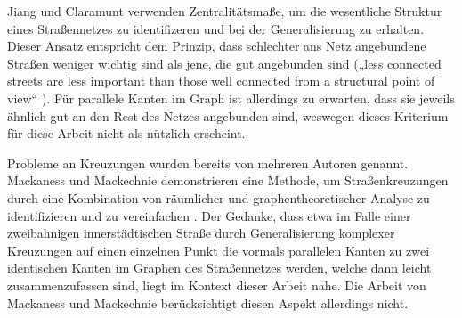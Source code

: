 \documentclass[../main/thesis.tex]{subfiles}
\begin{document}

Jiang und Claramunt verwenden Zentralitätsmaße, um die wesentliche Struktur eines Straßennetzes zu identifizeren und bei der Generalisierung zu erhalten. Dieser Ansatz entspricht dem Prinzip, dass schlechter ans Netz angebundene Straßen weniger wichtig sind als jene, die gut angebunden sind („less connected streets are less important than those well connected from a structural point of view“ ).  Für parallele Kanten im Graph ist allerdings zu erwarten, dass sie jeweils ähnlich gut an den Rest des Netzes angebunden sind, weswegen dieses Kriterium für diese Arbeit nicht als nützlich erscheint.


Probleme an Kreuzungen wurden bereits von mehreren Autoren genannt. Mackaness und Mackechnie demonstrieren eine Methode, um Straßenkreuzungen durch eine Kombination von räumlicher und graphentheoretischer Analyse zu identifizieren und zu vereinfachen . Der Gedanke, dass etwa im Falle einer zweibahnigen innerstädtischen Straße durch Generalisierung komplexer Kreuzungen auf einen einzelnen Punkt die vormals parallelen Kanten zu zwei identischen Kanten im Graphen des Straßennetzes werden, welche dann leicht zusammenzufassen sind, liegt im Kontext dieser Arbeit nahe. Die Arbeit von Mackaness und Mackechnie berücksichtigt diesen Aspekt allerdings nicht.


\end{document}
